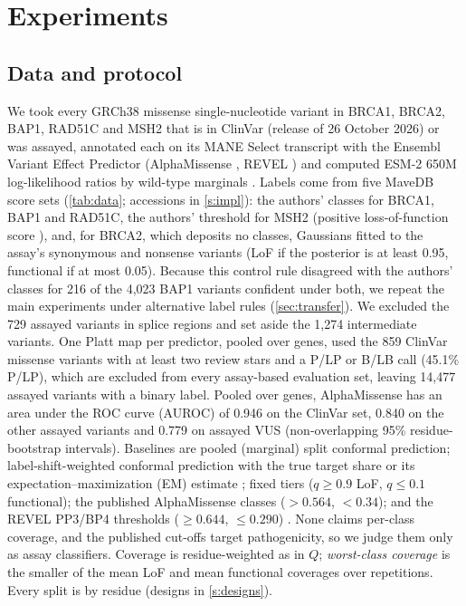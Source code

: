 \section{Experiments}\label{sec:experiments}

\subsection{Data and protocol}\label{sec:data}

We took every GRCh38 missense single-nucleotide variant in BRCA1, BRCA2, BAP1, RAD51C and MSH2 that is in ClinVar
\cite{Landrum2018} (release of 26 October 2026) or was assayed, annotated each on its MANE Select transcript with the
Ensembl Variant Effect Predictor \cite{McLaren2016} (AlphaMissense \cite{Cheng2023}, REVEL \cite{Ioannidis2016}) and
computed ESM-2 650M \cite{Lin2023} log-likelihood ratios by wild-type marginals \cite{Meier2021}. Labels come from five
MaveDB \cite{Esposito2019} score sets (\cref{tab:data}; accessions in \cref{s:impl}): the authors' classes for BRCA1,
BAP1 and RAD51C, the authors' threshold for MSH2 (positive loss-of-function score \cite{Jia2021}), and, for BRCA2, which
deposits no classes, Gaussians fitted to the assay's synonymous and nonsense variants (LoF if the posterior is at least
0.95, functional if at most 0.05). Because this control rule disagreed with the authors' classes for 216 of the 4,023 BAP1 variants
confident under both, we repeat the main experiments under alternative label rules (\cref{sec:transfer}). We excluded the 729
assayed variants in splice regions and set aside the 1,274 intermediate variants. One Platt map per predictor, pooled
over genes, used the 859 ClinVar missense variants with at least two review stars and a P/LP or B/LB call (45.1\%
P/LP), which are excluded from every assay-based evaluation set, leaving 14,477 assayed variants with a binary label. Pooled over
genes, AlphaMissense has an area under the ROC curve (AUROC) of 0.946 on the ClinVar set, 0.840 on the other assayed
variants and 0.779 on assayed VUS (non-overlapping 95\% residue-bootstrap intervals). Baselines are pooled (marginal)
split conformal prediction; label-shift-weighted conformal prediction \cite{Podkopaev2021} with the true target share or
its expectation--maximization (EM) estimate \cite{Saerens2002}; fixed tiers ($q\ge0.9$ LoF, $q\le0.1$ functional); the
published AlphaMissense classes ($>0.564$, $<0.34$); and the REVEL PP3/BP4 thresholds ($\ge0.644$, $\le0.290$)
\cite{Pejaver2022}. None claims per-class coverage, and the published cut-offs target pathogenicity, so we judge them
only as assay classifiers. Coverage is residue-weighted as in $Q$; \emph{worst-class coverage} is the smaller of the mean
LoF and mean functional coverages over repetitions. Every split is by residue (designs in \cref{s:designs}).

